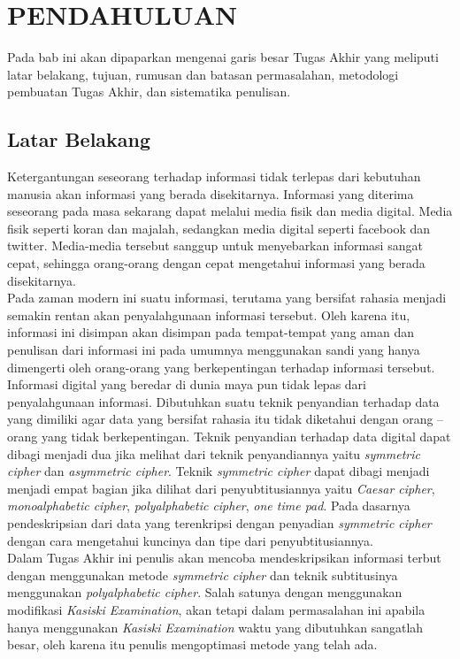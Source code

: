 \chapter{PENDAHULUAN}
  Pada bab ini akan dipaparkan mengenai garis besar Tugas Akhir yang meliputi latar belakang, tujuan, rumusan dan batasan permasalahan, metodologi pembuatan Tugas Akhir, dan sistematika penulisan.
  
  \section{Latar Belakang}	
	\indent Ketergantungan seseorang terhadap informasi tidak terlepas dari kebutuhan manusia akan informasi yang berada disekitarnya. Informasi yang diterima seseorang pada masa sekarang dapat melalui media fisik dan media digital. Media fisik seperti koran dan majalah, sedangkan media digital seperti facebook dan twitter. Media-media tersebut sanggup untuk menyebarkan informasi sangat cepat, sehingga orang-orang dengan cepat mengetahui informasi yang berada disekitarnya.
    \\
    \indent Pada zaman modern ini suatu informasi, terutama yang bersifat rahasia menjadi semakin rentan akan penyalahgunaan informasi tersebut. Oleh karena itu, informasi ini disimpan akan disimpan pada tempat-tempat yang aman dan penulisan dari informasi ini pada umumnya menggunakan sandi yang hanya dimengerti oleh orang-orang yang berkepentingan terhadap informasi tersebut.
    \\
	\indent Informasi digital yang beredar di dunia maya pun tidak lepas dari penyalahgunaan informasi. Dibutuhkan suatu teknik penyandian terhadap data yang dimiliki agar data yang bersifat rahasia itu tidak diketahui dengan orang – orang yang tidak berkepentingan. Teknik penyandian terhadap data digital dapat dibagi menjadi dua jika melihat dari teknik penyandiannya yaitu \textit{symmetric cipher} dan \textit{asymmetric cipher}. Teknik \textit{symmetric cipher} dapat dibagi menjadi menjadi empat bagian jika dilihat dari penyubtitusiannya yaitu \textit{Caesar cipher},\textit{ monoalphabetic cipher}, \textit{polyalphabetic cipher}, \textit{one time pad}. Pada dasarnya pendeskripsian dari data yang terenkripsi dengan penyadian \textit{symmetric cipher} dengan cara mengetahui kuncinya dan tipe dari penyubtitusiannya.
	\\
	\indent Dalam Tugas Akhir ini penulis akan mencoba mendeskripsikan informasi terbut dengan menggunakan metode \textit{symmetric cipher} dan teknik subtitusinya menggunakan \textit{polyalphabetic cipher}. Salah satunya dengan menggunakan modifikasi \textit{Kasiski Examination}, akan tetapi dalam permasalahan ini apabila hanya menggunakan \textit{Kasiski Examination} waktu yang dibutuhkan sangatlah besar, oleh karena itu penulis mengoptimasi metode yang telah ada.
    

